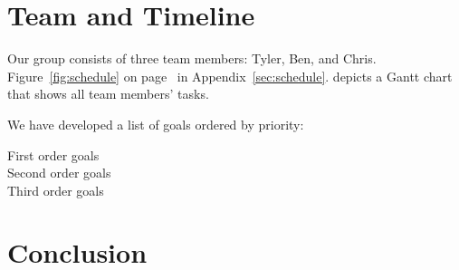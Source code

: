 \documentclass{acm_proc_article-sp}
\begin{document}


\section{Team and Timeline}

Our group consists of three team members: Tyler, Ben, and Chris.
Figure~\ref{fig:schedule} on page~\pageref{fig:schedule} in
Appendix~\ref{sec:schedule}. depicts a Gantt chart that shows all team members'
tasks.

We have developed a list of goals ordered by priority:
\begin{description}
	\item[First order goals]
	\item[Second order goals]
	\item[Third order goals]
\end{description}

\section{Conclusion}

\appendix
\end{document}
